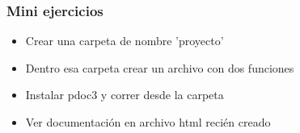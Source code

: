 \documentclass[14pt,aspectratio=169,xcolor=dvipsnames]{beamer}
\begin{document}
\begin{frame}
    \maketitle
\end{frame}
\begin{frame}[noframenumbering]\frametitle{Mini ejercicios}
    \begin{itemize}
        \item Crear una carpeta de nombre 'proyecto'
        \item Dentro esa carpeta crear un archivo con dos funciones
        \item Instalar pdoc3 y correr  desde la carpeta
        \item Ver documentación en archivo html recién creado
    \end{itemize}
\end{frame}
\end{document}
